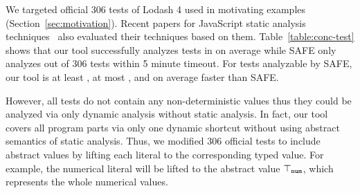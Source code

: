 We targeted official 306 tests of Lodash 4\cite{lodash} used in motivating
examples (Section~\ref{sec:motivation}).  Recent papers for JavaScript static
analysis techniques~\cite{value-refinement, value-partitioning} also evaluated
their techniques based on them.  Table~\ref{table:conc-test} shows that our tool
successfully analyzes  tests in  on average while
SAFE only analyzes  out of 306 tests within 5 minute timeout.  For
 tests analyzable by SAFE, our tool is at least , at
most , and  on average faster than SAFE.

However, all tests do not contain any non-deterministic values thus they could
be analyzed via only dynamic analysis without static analysis.  In fact, our
tool covers all program parts via only one dynamic shortcut without using
abstract semantics of static analysis.  Thus, we modified 306 official tests to
include abstract values by lifting each literal to the corresponding typed
value.  For example, the numerical literal  will be lifted to the
abstract value $\top_{\texttt{num}}$, which represents the whole numerical values.

% 
% 
% 
% 
% 
% 
